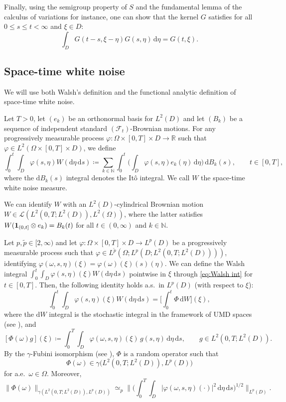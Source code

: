\documentclass{amsart}
\theoremstyle{plain}
\theoremstyle{remark}
\theoremstyle{plain}
\numberwithin{equation}{section}
\newcommand{\N}{\mathbb{N}}
\newcommand{\R}{\mathbb{R}}
\newcommand{\ceqq}{\coloneqq}
\newcommand{\col}{\colon}
\newcommand{\F}{{\mathscr F}}
\newcommand{\Om}{\Omega}
\newcommand{\om}{\omega}
\newcommand{\calL}{\mathcal{L}}
\newcommand{\dd}{\,\mathrm{d}}
\newcommand{\one}{{{\bf 1}}}
\newcommand{\ddd}{\mathrm{d}}
\begin{document}
Finally, using the semigroup property of $S$ and the fundamental lemma of the calculus of variations for instance, one can show that the kernel $G$ satisfies for all $0\leq s\leq t<\infty$ and  $\xi\in D$: 
\begin{equation}\label{eq:kernel semigrp prop}
  \int_D G(t-s,\xi-\eta)G(s,\eta) \dd\eta = G(t,\xi). 
\end{equation}

\subsection{Space-time white noise}\label{sub:white noise}

We will use both Walsh's definition and the functional analytic definition of space-time white noise. 

Let $T>0$, let $(e_k)$ be an orthonormal basis for $L^2(D)$ and let $(B_k)$ be a sequence of independent standard $(\F_t)$-Brownian motions. 
For any progressively measurable process $\varphi\col \Om\times [0,T]\times D\to \R$ such that $\varphi\in L^2(\Om\times[0,T]\times D)$, we define 
\begin{equation}\label{eq:Walsh int}
\int_0^t\int_D \varphi(s,\eta)W(\ddd\eta\dd s)\ceqq \sum_{k\in \N}\int_0^t\Big(\int_D\varphi(s,\eta)e_k(\eta)\dd \eta\Big)\dd B_k(s), \qquad t\in[0,T],
\end{equation}
where the $\ddd B_k(s)$ integral denotes the It\^o integral. We call $W$ the space-time white noise measure. 
 
We can identify $W$ with an $L^2(D)$-cylindrical Brownian motion $W\in \calL(L^2(0,T;L^2(D)),L^2(\Om))$, where the latter satisfies $W(\one_{(0,t]}\otimes e_k)= B_k(t)$ for all $t\in(0,\infty)$ and $k\in\N$. 

Let $p,\tilde p\in[2,\infty)$ and let $\varphi\col \Om\times[0,T]\times D \to L^p(D)$ be a progressively measurable process such that $\varphi \in L^{\tilde p}(\Omega; L^p(D; L^2(0,T; L^2(D))))$, identifying $\varphi(\om,s,\eta)(\xi)=\varphi(\om)(\xi)(s)(\eta)$.  
We can define the Walsh integral $\int_0^t\int_D\varphi(s,\eta)(\xi)W(\ddd \eta\dd s)$ pointwise in $\xi$ through \eqref{eq:Walsh int} for $t\in[0,T]$. 
Then, the following identity holds a.s.\ in $L^p(D)$ (with respect to $\xi$): 
\[
\int_0^t\int_D\varphi(s,\eta)(\xi)W(\ddd \eta\dd s) =  
\Big[\int_0^t \Phi\dd W\Big](\xi),
\]
where the $\ddd W$ integral is the stochastic integral in the framework of UMD spaces (see \cite{NVW15}), and    
\[
[\Phi(\omega)g](\xi)
\coloneqq
\int_0^T \int_D
\varphi(\om,s,\eta)(\xi)\,g(s,\eta)
\dd \eta\dd s,
\qquad
g\in L^2(0,T;L^2(D)).
\]
By the $\gamma$-Fubini isomorphism (see \cite[(3.1), (3.2)]{NVW15}), $\Phi$ is a random operator such that
\[
\Phi(\omega)
\in
\gamma\bigl(L^2(0,T;L^2(D)),L^p(D)\bigr) 
\] 
for a.e.\ $\om\in\Om$. 
Moreover,
\[
\|\Phi(\omega)\|_{\gamma(L^2(0,T;L^2(D)),L^p(D))}
\simeq_p
\bigg\|
\Big(
\int_0^T \int_D
|\varphi(\om,s,\eta)(\cdot)|^2
\dd \eta\dd s
\Big)^{1/2}
\bigg\|_{L^p(D)}.
\]
\end{document}
